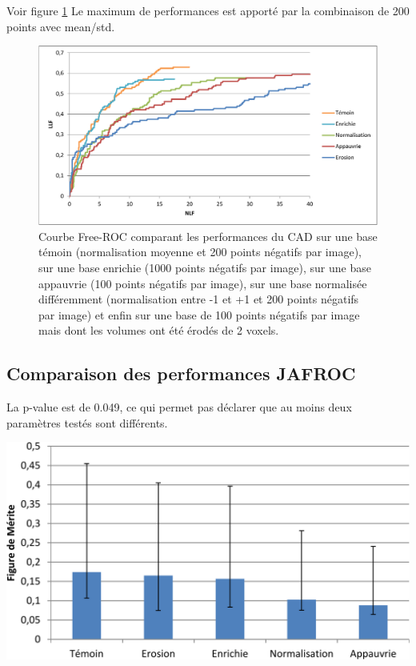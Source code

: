 Voir figure \ref{lab:froc_comp_static}
Le maximum de performances est apporté par la combinaison de 200 points avec mean/std.

\begin{figure}[h!]
 
 \begin{center}
   \includegraphics[width=15cm]{images/JAFROC_param}
 \end{center}
 \caption{\label{lab:froc_comp_static} Courbe Free-ROC comparant les performances du CAD sur une base témoin (normalisation moyenne et 200 points négatifs par image), sur une base enrichie (1000 points négatifs par image), sur une base appauvrie (100 points négatifs par image), sur une base normalisée différemment (normalisation entre -1 et +1 et 200 points négatifs par image) et enfin sur une base de 100 points négatifs par image mais dont les volumes ont été érodés de 2 voxels.}

\end{figure}


\subsection{Comparaison des performances JAFROC}

La p-value est de 0.049, ce qui permet pas déclarer que au moins deux paramètres testés sont différents.

\includegraphics[width=15cm]{images/FOM_param}


